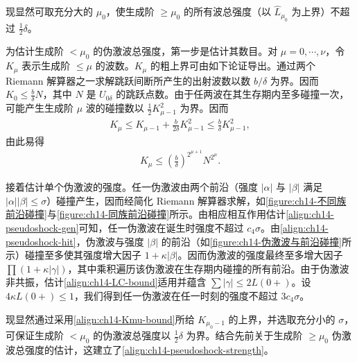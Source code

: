 \documentclass[../../main.tex]{subfiles}
\begin{document}
现显然可取充分大的 $\mu_0$，使生成阶 $\geqslant\mu_0$ 的所有波总强度（以 $\hat L_{\mu_0}$ 为上界）不超过 $\frac12\delta$。

为估计生成阶 $<\mu_0$ 的伪激波总强度，第一步是估计其数目。对 $\mu=0,\cdots,\nu$，令 $K_\mu$ 表示生成阶 $\leqslant\mu$ 的波数。$K_\mu$ 的粗上界可由如下论证导出。通过两个 Riemann 解算器之一求解跳跃间断所产生的出射波数以数 $b/\delta$ 为界。因而 $K_0\leqslant\frac{b}{\delta}N$，其中 $N$ 是 $U_{0\delta}$ 的跳跃点数。由于任两波在其生存期内至多碰撞一次，可能产生生成阶 $\mu$ 波的碰撞数以 $\frac12 K_{\mu-1}^2$ 为界。因而
\begin{align}
K_\mu\leqslant K_{\mu-1}+\frac{b}{2\delta}K_{\mu-1}^2\leqslant\frac{b}{\delta}K_{\mu-1}^2,
\label{align:ch14-Kmu}
\end{align}
由此易得
\begin{align}
K_\mu\leqslant\left(\frac{b}{\delta}\right)^{2^{\mu+1}}N^{2^\mu}.
\label{align:ch14-Kmu-bound}
\end{align}

接着估计单个伪激波的强度。任一伪激波由两个前沿（强度 $|\alpha|$ 与 $|\beta|$ 满足 $|\alpha||\beta|\leqslant\sigma$）碰撞产生，因而经简化 Riemann 解算器求解，如\cref{figure:ch14-不同族前沿碰撞}与\cref{figure:ch14-同族前沿碰撞}所示。由相应相互作用估计\eqref{align:ch14-pseudoshock-gen}可知，任一伪激波在诞生时强度不超过 $c_4\sigma$。由\eqref{align:ch14-pseudoshock-hit}，伪激波与强度 $|\beta|$ 的前沿（如\cref{figure:ch14-伪激波与前沿碰撞}所示）碰撞至多使其强度增大因子 $1+\kappa|\beta|$。因而伪激波的强度最终至多增大因子 $\prod(1+\kappa|\gamma|)$，其中乘积遍历该伪激波在生存期内碰撞的所有前沿。由于伪激波非共振，估计\eqref{align:ch14-LC-bound}适用并蕴含 $\sum|\gamma|\leqslant2L(0+)$。设 $4\kappa L(0+)\leqslant1$，我们得到任一伪激波在任一时刻的强度不超过 $3c_4\sigma$。

现显然通过采用\eqref{align:ch14-Kmu-bound}所给 $K_{\mu_0-1}$ 的上界，并选取充分小的 $\sigma$，可保证生成阶 $<\mu_0$ 的伪激波总强度以 $\frac12\delta$ 为界。结合先前关于生成阶 $\geqslant\mu_0$ 伪激波总强度的估计，这建立了\eqref{align:ch14-pseudoshock-strength}。
\end{document}
